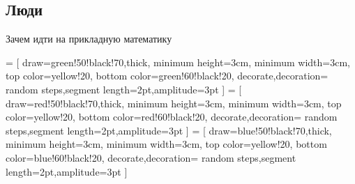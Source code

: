 \subsection{Люди}

\begin{frame}{Зачем идти на прикладную математику}
    \begin{center}
             = [
                draw=green!50!black!70,thick,
                minimum height=3cm,
                minimum width=3cm,
                top color=yellow!20,
                bottom color=green!60!black!20,
                decorate,decoration={
                    random steps,segment length=2pt,amplitude=3pt
                }
            ]
             = [
                draw=red!50!black!70,thick,
                minimum height=3cm,
                minimum width=3cm,
                top color=yellow!20,
                bottom color=red!60!black!20,
                decorate,decoration={
                    random steps,segment length=2pt,amplitude=3pt
                }
            ]
             = [
                draw=blue!50!black!70,thick,
                minimum height=3cm,
                minimum width=3cm,
                top color=yellow!20,
                bottom color=blue!60!black!20,
                decorate,decoration={
                    random steps,segment length=2pt,amplitude=3pt
                }
            ]
\end{center}
\end{frame}
